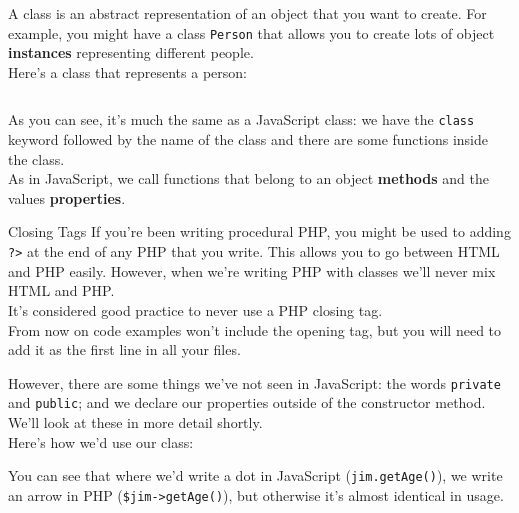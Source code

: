 A class is an abstract representation of an object that you want to create. For example, you might have a class \texttt{Person} that allows you to create lots of object \textbf{instances} representing different people.
\\

Here's a class that represents a person:

\inputminted{php}{02/figures/01/01-class.php}

As you can see, it's much the same as a JavaScript class: we have the \texttt{class} keyword followed by the name of the class and there are some functions inside the class.
\\

As in JavaScript, we call functions that belong to an object \textbf{methods} and the values \textbf{properties}.

\begin{infobox}{Closing Tags}
    If you're been writing procedural PHP, you might be used to adding \texttt{?>} at the end of any PHP that you write. This allows you to go between HTML and PHP easily. However, when we're writing PHP with classes we'll never mix HTML and PHP.
    \\

    It's considered good practice to never use a PHP closing tag.
    \\

    From now on code examples won't include the opening tag, but you will need to add it as the first line in all your files.
\end{infobox}


However, there are some things we've not seen in JavaScript: the words \texttt{private} and \texttt{public}; and we declare our properties outside of the constructor method. We'll look at these in more detail shortly.
\\

Here's how we'd use our class:


You can see that where we'd write a dot in JavaScript (\texttt{jim.getAge()}), we write an arrow in PHP (\texttt{\$jim->getAge()}), but otherwise it's almost identical in usage.

